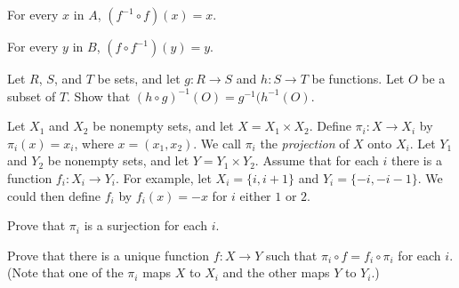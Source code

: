 	\item For every $x$ in $A$, $\left( f^{-1}  \circ f \right)(x) = x$.

	\item For every $y$ in $B$, $\left( f \circ f^{-1}\right)(y) = y$.

	\ea
	
\begin{comment}

\ExerciseSolution

\ba

\item Let $x \in A$ and let $f(x) = y$.  By Theorem~\ref{T:inversenotation}, we can conclude that  $f^{-1}(y) = x$.  Therefore,
\[(f^{-1} \circ f)(x) = f^{-1}(f(x)) = f^{-1}(y) = x.\]

\item Let $y \in B$. Since $f$ is a bijection, there is a unique $x \in A$ such that $f(x) = y$. Theorem~\ref{T:inversenotation} tells us that $f^{-1}(y) = x$. So 
\[(f \circ f^{-1})(y) = f(f^{-1}(y)) = f(x) = y.\]

\ea

\end{comment}

\item \label{ex:inverse_composite_sets} Let $R$, $S$, and $T$ be sets, and let $g: R \to S$ and $h : S \to T$ be functions.  Let $O$ be a subset of $T$.  Show that $(h \circ g)^{-1}(O) = g^{-1}(h^{-1}(O)$.  


\begin{comment}

\ExerciseSolution First let $x \in (h \circ g)^{-1}(O)$. Then $(h \circ g)(x) \in O$. It follows that $h(g(x)) \in O$. So $g(x) \in h^{-1}(O)$. From this we have $x \in g^{-1}(h^{-1}(O))$. We conclude that $(h \circ g)^{-1}(O) \subseteq g^{-1}(h^{-1}(O))$. 

Now suppose that $x \in g^{-1}(h^{-1}(O))$. Then $g(x) \in h^{-1}(O)$. From this we have that $h(g(x)) \in O$. Thus, $(h \circ g)(x) \in O$ and $x \in (h \circ g)^{-1}(O)$. We conclude that $g^{-1}(h^{-1}(O)) \subseteq (h \circ g)^{-1}(O)$. The two containments confirm the equality $(h \circ g)^{-1}(O) = g^{-1}(h^{-1}(O)$. 

\end{comment}



\item Let $X_1$ and $X_2$ be nonempty sets, and let $X = X_1 \times X_2$. Define $\pi_i :X  \to X_i$ by $\pi_i(x) = x_i$, where $x = (x_1,x_2)$. We call $\pi_i$ the \emph{projection} of $X$ onto $X_i$.  Let $Y_1$ and $Y_2$ be nonempty sets, and let $Y = Y_1 \times Y_2$.  Assume that for each $i$ there is a function $f_i : X_i \to Y_i$. For example, let $X_i = \{i,i+1\}$ and $Y_i = \{-i, -i-1\}$. We could then define $f_i$ by $f_i(x) = -x$ for $i$ either $1$ or $2$. 
\ba
\item Prove that $\pi_i$ is a surjection for each $i$.
\item Prove that there is a unique function $f: X \to Y$ such that $\pi_i \circ f = f_i \circ \pi_i$ for each $i$. (Note that one of the $\pi_i$ maps $X$ to $X_i$ and the other maps $Y$ to $Y_i$.)

